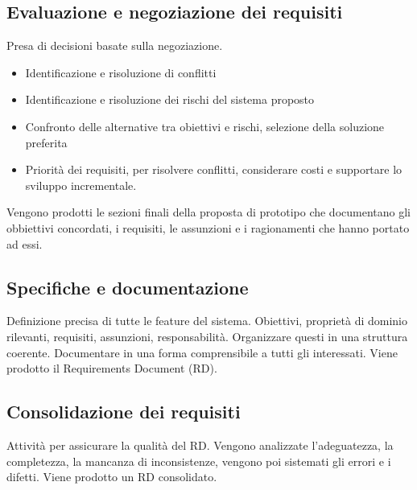 \documentclass[../main.tex]{subfiles}
\begin{document}
\subsection{Evaluazione e negoziazione dei requisiti}
Presa di decisioni basate sulla negoziazione. 
\begin{itemize}
	\item Identificazione e risoluzione di conflitti 
	\item Identificazione e risoluzione dei rischi del sistema proposto
	\item Confronto delle alternative tra obiettivi e rischi, selezione della soluzione preferita
	\item Priorità dei requisiti, per risolvere conflitti, considerare costi e supportare lo sviluppo incrementale.
\end{itemize}
Vengono prodotti le sezioni finali della proposta di prototipo che documentano gli obbiettivi concordati, i requisiti, le assunzioni e i ragionamenti che hanno portato ad essi.
\subsection{Specifiche e documentazione}
Definizione precisa di tutte le feature del sistema.
Obiettivi, proprietà di dominio rilevanti, requisiti, assunzioni, responsabilità.
Organizzare questi in una struttura coerente. Documentare in una forma comprensibile a tutti gli interessati. Viene prodotto il Requirements Document (RD).
\subsection{Consolidazione dei requisiti}
Attività per assicurare la qualità del RD. Vengono analizzate l'adeguatezza, la completezza, la mancanza di inconsistenze, vengono poi sistemati gli errori e i difetti. Viene prodotto un RD consolidato.
\end{document}
